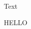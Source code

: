 \documentclass{scrartcl}
\let\myshipout\shipout
\begin{document}
  \let\shipout\myshipout

  Text
  \begin{preview}HELLO\end{preview}
\end{document}
